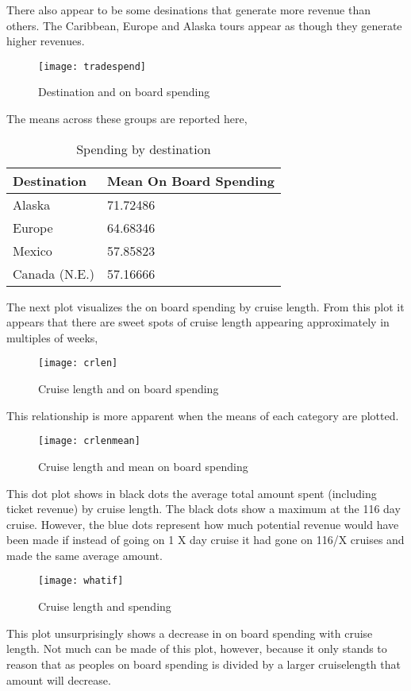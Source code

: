 \documentclass[twoside,twocolumn]{article}
\begin{document}
There also appear to be some desinations that generate more revenue than others. The Caribbean, Europe and Alaska tours appear as though they generate higher revenues.

\begin{figure}[H]
	\centering 
	\texttt{[image: tradespend]}
	\caption{Destination and on board spending}
\end{figure}
The means across these groups are reported here, 
\begin{table}[H]
	\centering 
	\begin{tabular}{ll}
		Destination & Mean On Board Spending \\
		\hline 
		Alaska & 71.72486 \\
		Europe & 64.68346 \\
		Mexico & 57.85823 \\
		Canada (N.E.) & 57.16666 \\
	\end{tabular}
	\caption{Spending by destination}
\end{table}

The next plot visualizes the on board spending by cruise length. From this plot it appears that there are sweet spots of cruise length appearing approximately in multiples of weeks, 
\begin{figure}[H]
	\centering 
	\texttt{[image: crlen]}
	\caption{Cruise length and on board spending}
\end{figure}

This relationship is more apparent when the means of each category are plotted. 
\begin{figure}[H]
	\centering 
	\texttt{[image: crlenmean]}
	\caption{Cruise length and mean on board spending}
\end{figure}

This dot plot shows in black dots the average total amount spent (including ticket revenue)  by cruise length. The black dots show a maximum at the 116 day cruise. However, the blue dots represent how much potential revenue would have been made if instead of going on 1 X day cruise it had gone on 116/X cruises and made the same average amount. 

\begin{figure}[H]
	\centering 
	\texttt{[image: whatif]}
	\caption{Cruise length and spending}
\end{figure}

This plot unsurprisingly shows a decrease in on board spending with cruise length. Not much can be made of this plot, however, because it only stands to reason that as peoples on board spending is divided by a larger cruiselength that amount will decrease. 
\end{document}
